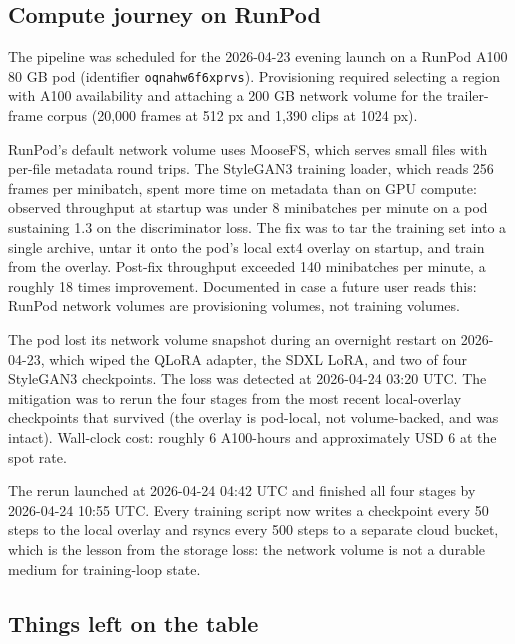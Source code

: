 \documentclass{article}
\begin{document}
\subsection{Compute journey on RunPod}

The pipeline was scheduled for the 2026-04-23 evening launch on a RunPod A100 80 GB pod (identifier \texttt{oqnahw6f6xprvs}). Provisioning required selecting a region with A100 availability and attaching a 200 GB network volume for the trailer-frame corpus (20,000 frames at 512 px and 1,390 clips at 1024 px).

RunPod's default network volume uses MooseFS, which serves small files with per-file metadata round trips. The StyleGAN3 training loader, which reads 256 frames per minibatch, spent more time on metadata than on GPU compute: observed throughput at startup was under 8 minibatches per minute on a pod sustaining 1.3 on the discriminator loss. The fix was to tar the training set into a single archive, untar it onto the pod's local ext4 overlay on startup, and train from the overlay. Post-fix throughput exceeded 140 minibatches per minute, a roughly 18 times improvement. Documented in case a future user reads this: RunPod network volumes are provisioning volumes, not training volumes.

The pod lost its network volume snapshot during an overnight restart on 2026-04-23, which wiped the QLoRA adapter, the SDXL LoRA, and two of four StyleGAN3 checkpoints. The loss was detected at 2026-04-24 03:20 UTC. The mitigation was to rerun the four stages from the most recent local-overlay checkpoints that survived (the overlay is pod-local, not volume-backed, and was intact). Wall-clock cost: roughly 6 A100-hours and approximately USD 6 at the spot rate.

The rerun launched at 2026-04-24 04:42 UTC and finished all four stages by 2026-04-24 10:55 UTC. Every training script now writes a checkpoint every 50 steps to the local overlay and rsyncs every 500 steps to a separate cloud bucket, which is the lesson from the storage loss: the network volume is not a durable medium for training-loop state.

\subsection{Things left on the table}
\end{document}
